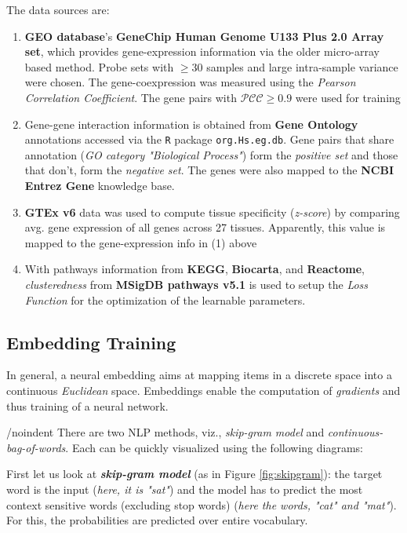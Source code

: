     The data sources are:
    \begin{enumerate}
        \item \textbf{GEO database}'s \textbf{GeneChip Human Genome U133 Plus 2.0 Array set},  which provides gene-expression information via the older micro-array based method. Probe sets with $\ge30$ samples and large intra-sample variance were chosen. The gene-coexpression was measured using the \textit{Pearson Correlation Coefficient}. The gene pairs with $\mathcal{PCC} \ge0.9$ were used for training
        \item Gene-gene interaction information is obtained from \textbf{Gene Ontology} annotations accessed via the \verb|R| package \verb|org.Hs.eg.db|. Gene pairs that share annotation (\textit{GO category "Biological Process"}) form the \textit{positive set} and those that don't, form the \textit{negative set}. The genes were also mapped to the \textbf{NCBI Entrez Gene} knowledge base.
        \item \textbf{GTEx v6} data was used to compute tissue specificity (\textit{z-score}) by comparing avg. gene expression of all genes across 27 tissues. Apparently, this value is mapped to the gene-expression info in (1) above
        \item With pathways information from \textbf{KEGG}, \textbf{Biocarta}, and \textbf{Reactome}, \textit{clusteredness} from \textbf{MSigDB pathways v5.1} is used to setup the \textit{Loss Function} for the optimization of the learnable parameters.
    \end{enumerate}

    \subsection{Embedding Training}

    In general, a neural embedding aims at mapping items in a discrete space into a continuous \textit{Euclidean} space. Embeddings enable the computation of \textit{gradients} and thus training of a neural network.

    /noindent There are two NLP methods, viz., \textit{skip-gram model} and \textit{continuous-bag-of-words}. Each can be quickly visualized using the following diagrams:

    First let us look at \textbf{\textit{skip-gram model}} (as in Figure \ref{fig:skipgram}): the target word is the input (\textit{here, it is "sat"}) and the model has to predict the most context sensitive words (excluding stop words) (\textit{here the words, "cat" and "mat"}). For this, the probabilities are predicted over entire vocabulary.\\

